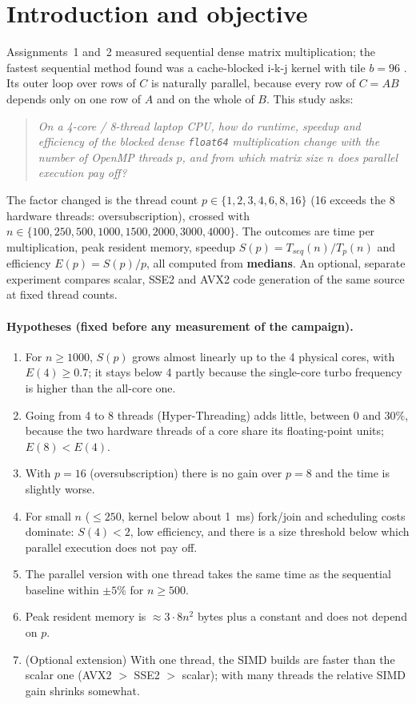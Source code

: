\section{Introduction and objective}
Assignments~1 and~2 measured sequential dense matrix multiplication; the fastest sequential method found was a
cache-blocked i-k-j kernel with tile $b=96$ \cite{a2}. Its outer loop over rows of $C$ is naturally parallel, because
every row of $C=AB$ depends only on one row of $A$ and on the whole of $B$. This study asks:

\begin{quote}
\emph{On a 4-core / 8-thread laptop CPU, how do runtime, speedup and efficiency of the blocked dense \texttt{float64}
multiplication change with the number of OpenMP threads $p$, and from which matrix size $n$ does parallel execution pay off?}
\end{quote}

The factor changed is the thread count $p\in\{1,2,3,4,6,8,16\}$ (16 exceeds the 8 hardware threads: oversubscription),
crossed with $n\in\{100,250,500,1000,1500,2000,3000,4000\}$. The outcomes are time per multiplication, peak resident memory,
speedup $S(p)=T_{seq}(n)/T_p(n)$ and efficiency $E(p)=S(p)/p$, all computed from \textbf{medians}.
An optional, separate experiment compares scalar, SSE2 and AVX2 code generation of the same source at fixed thread counts.

\paragraph{Hypotheses (fixed before any measurement of the campaign).}
\begin{enumerate}[label=\textbf{H\arabic*}]
\item For $n\ge1000$, $S(p)$ grows almost linearly up to the 4 physical cores, with $E(4)\ge0.7$; it stays below 4 partly
because the single-core turbo frequency is higher than the all-core one.
\item Going from 4 to 8 threads (Hyper-Threading) adds little, between 0 and $30\%$, because the two hardware threads
of a core share its floating-point units; $E(8)<E(4)$.
\item With $p=16$ (oversubscription) there is no gain over $p=8$ and the time is slightly worse.
\item For small $n$ ($\le250$, kernel below about 1~ms) fork/join and scheduling costs dominate: $S(4)<2$, low efficiency, and
there is a size threshold below which parallel execution does not pay off.
\item The parallel version with one thread takes the same time as the sequential baseline within $\pm5\%$ for $n\ge500$.
\item Peak resident memory is $\approx 3\cdot8n^2$ bytes plus a constant and does not depend on $p$.
\item (Optional extension) With one thread, the SIMD builds are faster than the scalar one (AVX2 $>$ SSE2 $>$ scalar);
with many threads the relative SIMD gain shrinks somewhat.
\end{enumerate}

